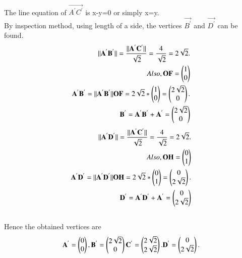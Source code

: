 \documentclass[journal,12pt,twocolumn]{IEEEtran}
\begin{document}
\\
The line equation of $\vec{A^{'}C^{'}}$ is x-y=0 or simply x=y.\\
By inspection method,
using length of a side, the vertices $\vec{B^{'}}$ and $\vec{D^{'}}$ can be found.\\
\begin{align}
\begin{split}
\Vert\mathbf{A^{'}B^{'}}\Vert = \frac{\Vert\mathbf{A^{'}C^{'}}\Vert}{\sqrt{2}} = \frac{4}{\sqrt{2}}=2\sqrt{2}.\\
Also, \mathbf{OF} = \begin{pmatrix}1\\0\end{pmatrix}\\
\mathbf{A^{'}B^{'}} = \Vert\mathbf{A^{'}B^{'}}\Vert\mathbf{OF}=2\sqrt{2}*\begin{pmatrix}1\\0\end{pmatrix}=\begin{pmatrix}2\sqrt{2}\\0\end{pmatrix}.\\
\mathbf{B^{'}} = \mathbf{A^{'}B^{'}}+\mathbf{A^{'}}=\begin{pmatrix}2\sqrt{2}\\0\end{pmatrix}\\
\end{split}
\end{align}
\begin{align}
\begin{split}
\Vert\mathbf{A^{'}D^{'}}\Vert = \frac{\Vert\mathbf{A^{'}C^{'}}\Vert}{\sqrt{2}} = \frac{4}{\sqrt{2}}=2\sqrt{2}.\\
Also, \mathbf{OH} = \begin{pmatrix}0\\1\end{pmatrix}\\
\mathbf{A^{'}D^{'}} = \Vert\mathbf{A^{'}D^{'}}\Vert\mathbf{OH}=2\sqrt{2}*\begin{pmatrix}0\\1\end{pmatrix}=\begin{pmatrix}0\\2\sqrt{2}\end{pmatrix}.\\
\mathbf{D^{'}} = \mathbf{A^{'}D^{'}}+\mathbf{A^{'}}=\begin{pmatrix}0\\2\sqrt{2}\end{pmatrix}\\
\end{split}
\end{align}
\\
Hence the obtained vertices are 
\begin{align}
\begin{split}
\mathbf{A^{'}} = \begin{pmatrix}0 \\ 0\end{pmatrix},
\mathbf{B^{'}} = \begin{pmatrix}2\sqrt{2}\\0\end{pmatrix}
\mathbf{C^{'}} = \begin{pmatrix}2\sqrt{2}\\2\sqrt{2}\end{pmatrix}.
\mathbf{D^{'}} = \begin{pmatrix}0\\2\sqrt{2}\end{pmatrix}.
\end{split}
\end{align}
\end{document}
